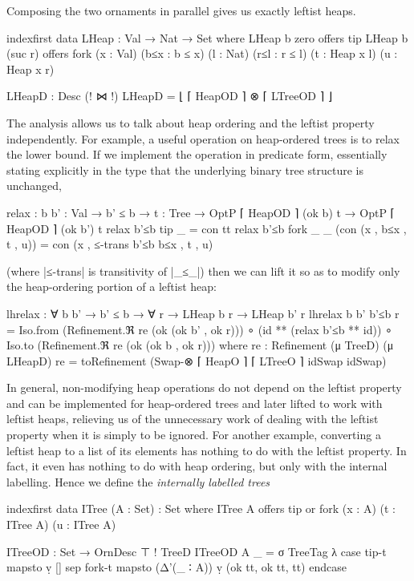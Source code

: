 Composing the two ornaments in parallel gives us exactly leftist heaps.
\begin{code}
indexfirst data LHeap : Val → Nat → Set where
  LHeap b zero     offers  tip
  LHeap b (suc r)  offers  fork  (x : Val) (b≤x : b ≤ x)
                                 (l : Nat) (r≤l : r ≤ l) (t : Heap x l) (u : Heap x r)
                 
LHeapD : Desc (! ⋈ !)
LHeapD = ⌊ ⌈ HeapOD ⌉ ⊗ ⌈ LTreeOD ⌉ ⌋
\end{code}
The analysis allows us to talk about heap ordering and the leftist property independently.
For example, a useful operation on heap-ordered trees is to relax the lower bound.
If we implement the operation in predicate form, essentially stating explicitly in the type that the underlying binary tree structure is unchanged,
\begin{code}
relax :  {b b' : Val} → b' ≤ b →
         {t : Tree} → OptP ⌈ HeapOD ⌉ (ok b) t → OptP ⌈ HeapOD ⌉ (ok b') t
relax b'≤b {tip}       _                        =  con tt
relax b'≤b {fork _ _}  (con (x , b≤x , t , u))  =  con (x , ≤-trans b'≤b b≤x , t , u)
\end{code}
(where |≤-trans| is transitivity of |_≤_|) then we can lift it so as to modify only the heap-ordering portion of a leftist heap:
\begin{code}
lhrelax : ∀ {b b'} → b' ≤ b → ∀ {r} → LHeap b r → LHeap b' r
lhrelax {b} {b'} b'≤b {r} =
  Iso.from (Refinement.ℜ re (ok (ok b' , ok r))) ∘
    (id ** (relax b'≤b ** id)) ∘ Iso.to (Refinement.ℜ re (ok (ok b , ok r)))
  where
    re : Refinement (μ TreeD) (μ LHeapD)
    re = toRefinement (Swap-⊗ ⌈ HeapO ⌉ ⌈ LTreeO ⌉ idSwap idSwap)
\end{code}
In general, non-modifying heap operations do not depend on the leftist property and can be implemented for heap-ordered trees and later lifted to work with leftist heaps, relieving us of the unnecessary work of dealing with the leftist property when it is simply to be ignored.
For another example, converting a leftist heap to a list of its elements has nothing to do with the leftist property.
In fact, it even has nothing to do with heap ordering, but only with the internal labelling.
Hence we define the \emph{internally labelled trees}
\begin{code}
indexfirst data ITree (A : Set) : Set where
  ITree A  offers  tip
           or      fork (x : A) (t : ITree A) (u : ITree A)

ITreeOD : Set → OrnDesc ⊤ ! TreeD
ITreeOD A _ = σ TreeTag  λ  case  tip-t   mapsto  ṿ []
                            sep   fork-t  mapsto  (Δ'(_ ∶ A)) ṿ (ok tt, ok tt, tt) endcase
\end{code}
